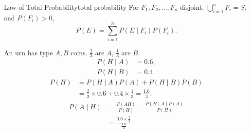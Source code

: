 \begin{theorem}{Law of Total Probability}{total-probability}
  For $F_1,F_2,\ldots,F_n$ disjoint, $\bigcup_{i=1}^n F_i=S$, and $P(F_i)>0$,
  \[
    P(E)=\sum_{i=1}^n P(E\mid F_i)P(F_i).
  \]
\end{theorem}

\begin{example}
  An urn has type $A,B$ coins. $\frac23$ are $A$, $\frac13$ are $B$.
  \begin{align*}
    P(H\mid A) & =0.6, \\
    P(H\mid B) & =0.4.
  \end{align*}
  \begin{align*}
    P(H) & =P(H\mid A)P(A)+P(H\mid B)P(B)                    \\
         & =\frac23\times0.6+0.4\times\frac13=\frac{1.6}{3}.
  \end{align*}
  \begin{align*}
    P(A\mid H) & =\frac{P(AH)}{P(H)}=\frac{P(H\mid A)P(A)}{P(H)} \\
               & =\frac{0.6\times\frac23}{\frac{1.6}{3}}.
  \end{align*}
\end{example}


